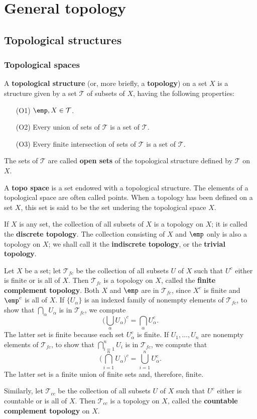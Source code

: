 \chapter{General topology}
\section{Topological structures}
\subsection{Topological spaces}
\begin{definition}
A \textbf{topological structure} (or, more briefly, a \textbf{topology}) on a set $X$ is a structure given by a set $\mathcal{T}$ of subsets of $X$, having the following properties:
\begin{itemize}
\item[(O1)] $\emp,X\in\mathcal{T}$.
\item[(O2)] Every union of sets of $\mathcal{T}$ is a set of $\mathcal{T}$.
\item[(O3)] Every finite intersection of sets of $\mathcal{T}$ is a set of $\mathcal{T}$.
\end{itemize}
The sets of $\mathcal{T}$ are called \textbf{open sets} of the topological structure defined by $\mathcal{T}$ on $X$.
\end{definition}
A \textbf{topo space} is a set endowed with a topological structure. The elements of a topological space are often called points. When a topology has been defined on a set $X$, this set is said to be the set undering the topological space $X$.
\begin{example}
If $X$ is any set, the collection of all subsets of $X$ is a topology on $X$; it is called the \textbf{discrete topology}. The collection consisting of $X$ and $\emp$ only is also a topology on $X$; we shall call it the \textbf{indiscrete topology}, or the \textbf{trivial topology}.
\end{example}
\begin{example}
Let $X$ be a set; let $\mathcal{T}_{fc}$ be the collection of all subsets $U$ of $X$ such that $U^c$ either is finite or is all of $X$. Then $\mathcal{T}_{fc}$ is a topology on $X$, called the \textbf{finite complement topology}. Both $X$ and $\emp$ are in $\mathcal{T}_{fc}$, since $X^c$ is finite and $\emp^c$ is all of $X$. If $\{U_\alpha\}$ is an indexed family of nonempty elements of $\mathcal{T}_{fc}$, to show that $\bigcap_\alpha U_\alpha$ is in $\mathcal{T}_{fc}$, we compute
\[\Big(\bigcup_\alpha U_\alpha\Big)^c=\bigcap_\alpha U_\alpha^c.\]
The latter set is finite because each set $U_\alpha^c$ is finite. If $U_1,\dots,U_n$ are nonempty elements of $\mathcal{T}_{fc}$, to show that $\bigcap_{i=1}^{n}U_i$ is in $\mathcal{T}_{fc}$, we compute that
\[\Big(\bigcap_{i=1}^{n}U_\alpha\Big)^c=\bigcup_{i=1}^{n}U_\alpha^c.\]
The latter set is a finite union of finite sets and, therefore, finite.\par
Similarly, let $\mathcal{T}_{cc}$ be the collection of all subsets $U$ of $X$ such that $U^c$ either is countable or is all of $X$. Then $\mathcal{T}_{cc}$ is a topology on $X$, called the \textbf{countable complement topology} on $X$.
\end{example}
